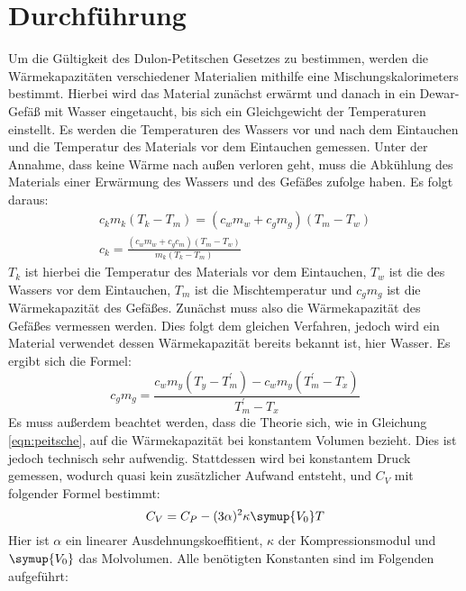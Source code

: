 \section{Durchführung}
\label{sec:Durchführung}
Um die Gültigkeit des Dulon-Petitschen Gesetzes zu bestimmen, werden die Wärmekapazitäten verschiedener Materialien
mithilfe eine Mischungskalorimeters bestimmt.
Hierbei wird das Material zunächst erwärmt und danach in ein Dewar-Gefäß mit Wasser eingetaucht,
bis sich ein Gleichgewicht der Temperaturen einstellt.
Es werden die Temperaturen des Wassers vor und nach dem Eintauchen und die Temperatur des Materials vor dem Eintauchen gemessen.
Unter der Annahme, dass keine Wärme nach außen verloren geht,
muss die Abkühlung des Materials einer Erwärmung des Wassers und des Gefäßes zufolge haben.
Es folgt daraus:
\begin{gather}
    c_km_k(T_k-T_m) = (c_wm_w + c_gm_g)(T_m - T_w) \\
    c_k = \frac{(c_wm_w + c_gc_m)(T_m - T_w)}{m_k(T_k - T_m)}
\end{gather}
$T_k$ ist hierbei die Temperatur des Materials vor dem Eintauchen, $T_w$ ist die des Wassers vor dem Eintauchen,
$T_m$ ist die Mischtemperatur und $c_gm_g$ ist die Wärmekapazität des Gefäßes.
Zunächst muss also die Wärmekapazität des Gefäßes vermessen werden. Dies folgt dem gleichen Verfahren, jedoch wird ein Material verwendet
dessen Wärmekapazität bereits bekannt ist, hier Wasser.
Es ergibt sich die Formel:
\begin{equation}
    \label{eqn:gefaess}
    c_gm_g = \frac{c_wm_y\left(T_y - T^{\prime}_m\right) - c_wm_y\left(T^{\prime}_m - T_x\right)}{T^{\prime}_m - T_x}
\end{equation}
Es muss außerdem beachtet werden, dass die Theorie sich, wie in Gleichung \eqref{eqn:peitsche},
auf die Wärmekapazität bei konstantem Volumen bezieht.
Dies ist jedoch technisch sehr aufwendig. Stattdessen wird bei konstantem Druck gemessen,
wodurch quasi kein zusätzlicher Aufwand entsteht, und $C_V$ mit folgender Formel bestimmt:
\begin{equation}
    C_V = C_P - (3\alpha)^2\kappa\symup{V_0}T
\end{equation}
Hier ist $\alpha$ ein linearer Ausdehnungskoeffitient, $\kappa$ der Kompressionsmodul und $\symup{V_0}$ das Molvolumen.
Alle benötigten Konstanten sind im Folgenden aufgeführt:
